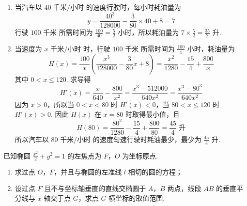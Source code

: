 \begin{solution}
\begin{enumerate}
\item 当汽车以 \(40\text{ 千米/小时}\) 的速度行驶时，每小时耗油量为
\[
y=\frac{40^{3}}{128000}-\frac{3}{80}\times40+8=7
\]
行驶 \(100\text{ 千米}\) 所需时间为 \(\frac{100}{40}=\frac{5}{2}\) 小时，所以耗油量为 \(7\times\frac{5}{2}=\frac{35}{2}\text{ 升}\).
\item 当速度为 \(x\text{ 千米/小时}\) 时，行驶 \(100\text{ 千米}\) 所需时间为 \(\frac{100}{x}\) 小时，耗油量为
\[
H(x)=\frac{100}{x}\left(\frac{x^{3}}{128000}-\frac{3}{80}x+8\right)=\frac{x^{2}}{1280}-\frac{15}{4}+\frac{800}{x}
\]
其中 \(0<x\leqslant120\). 求导得
\[
H'(x)=\frac{x}{640}-\frac{800}{x^{2}}=\frac{x^{3}-512000}{640x^{2}}=\frac{x^{3}-80^{3}}{640x^{2}}
\]
因为 \(x>0\)，所以当 \(0<x<80\) 时 \(H'(x)<0\)，当 \(80<x\leqslant120\) 时 \(H'(x)>0\). 因此 \(H(x)\) 在 \(x=80\) 时取得最小值，且
\[
H(80)=\frac{80^{2}}{1280}-\frac{15}{4}+\frac{800}{80}=\frac{45}{4}\text{ 升}
\]
所以汽车以 \(80\text{ 千米/小时}\) 的速度匀速行驶时耗油最少，最少为 \(\frac{45}{4}\text{ 升}\).
\end{enumerate}
\end{solution}

\begin{problem}
已知椭圆 \(\frac{x^2}{2} + y^2 = 1\) 的左焦点为 \(F\)，\(O\) 为坐标原点.
\begin{enumerate}
\item 求过点 \(O\)，\(F\)，并且与椭圆的左准线 \(l\) 相切的圆的方程；
\item 设过点 \(F\) 且不与坐标轴垂直的直线交椭圆于 \(A\)，\(B\) 两点，线段 \(AB\) 的垂直平分线与 \(x\) 轴交于点 \(G\)，求点 \(G\) 横坐标的取值范围.
\end{enumerate}

\end{problem}

